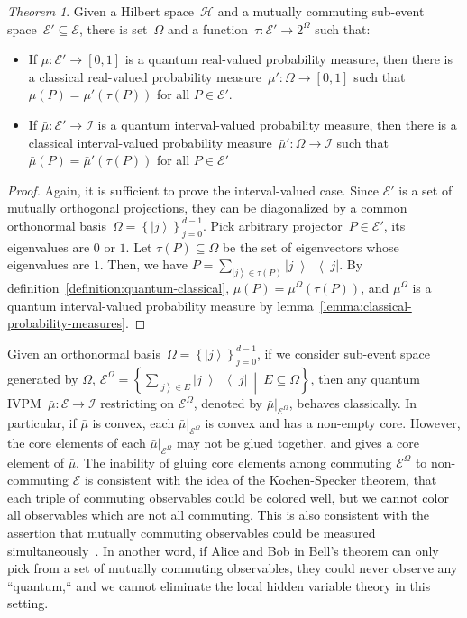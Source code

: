 \documentclass[12pt]{iopart}
\theoremstyle{remark}
\newtheorem{thm}{Theorem}
\newcommand{\Hilb}{\mathcal{H}}
\newcommand{\events}{\ensuremath{\mathcal{E}}}
\newcommand{\ket}[1]{{\left\vert{#1}\right\rangle}}
\newcommand{\op}[2]{\ensuremath{\left\vert{#1}\middle\rangle\middle\langle{#2}\right\vert}}
\newcommand{\proj}[1]{\op{#1}{#1}}
\newcommand{\set}[2]{\ensuremath{\left\{ {#1}~\middle|~{#2}\right\} }}
\begin{document}
\begin{thm}Given a Hilbert space~$\Hilb$ and a mutually commuting
sub-event space~$\events'\subseteq\events$, there is set~$\Omega$
and a function~$\tau:\events'\rightarrow2^{\Omega}$ such that:
\begin{itemize}
\item If $\mu:\events'\rightarrow\left[0,1\right]$ is a quantum real-valued
probability measure, then there is a classical real-valued probability
measure~$\mu':\Omega\rightarrow\left[0,1\right]$ such that $\mu\left(P\right)=\mu'\left(\tau\left(P\right)\right)$
for all $P\in\events'$.
\item If $\bar{\mu}:\events'\rightarrow\mathscr{I}$ is a quantum interval-valued
probability measure, then there is a classical interval-valued probability
measure~$\bar{\mu}':\Omega\rightarrow\mathscr{I}$ such that $\bar{\mu}\left(P\right)=\bar{\mu}'\left(\tau\left(P\right)\right)$
for all $P\in\events'$
\end{itemize}
\end{thm}

\begin{proof}Again, it is sufficient to prove the interval-valued
case. Since $\events'$ is a set of mutually orthogonal projections,
they can be diagonalized by a common orthonormal basis~$\Omega=\left\{ \ket{j}\right\} _{j=0}^{d-1}$.
Pick arbitrary projector~$P\in\events'$, its eigenvalues are $0$
or $1$. Let $\tau\left(P\right)\subseteq\Omega$ be the set of eigenvectors
whose eigenvalues are $1$. Then, we have $P=\sum_{\ket{j}\in\tau\left(P\right)}\proj{j}$.
By definition~\ref{definition:quantum-classical}, $\bar{\mu}\left(P\right)=\bar{\mu}^{\Omega}\left(\tau\left(P\right)\right)$,
and $\bar{\mu}^{\Omega}$ is a quantum interval-valued probability
measure by lemma~\ref{lemma:classical-probability-measures}.\end{proof}

Given an orthonormal basis~$\Omega=\left\{ \ket{j}\right\} _{j=0}^{d-1}$,
if we consider sub-event space generated by $\Omega$, $\events^{\Omega}=\set{\sum_{\ket{j}\in E}\proj{j}}{E\subseteq\Omega}$,
then any quantum IVPM~$\bar{\mu}:\events\rightarrow\mathscr{I}$
restricting on $\events^{\Omega}$, denoted by $\bar{\mu}|_{\events^{\Omega}}$,
behaves classically. In particular, if $\bar{\mu}$ is convex, each
$\bar{\mu}|_{\events^{\Omega}}$ is convex and has a non-empty core.
However, the core elements of each $\bar{\mu}|_{\events^{\Omega}}$
may not be glued together, and gives a core element of $\bar{\mu}$.
The inability of gluing core elements among commuting $\events^{\Omega}$
to non-commuting $\events$ is consistent with the idea of the Kochen-Specker
theorem, that each triple of commuting observables could be colored
well, but we cannot color all observables which are not all commuting.
This is also consistent with the assertion that mutually commuting
observables could be measured simultaneously~\cite{Mermin_1993}.
In another word, if Alice and Bob in Bell's theorem can only pick
from a set of mutually commuting observables, they could never observe
any ``quantum,`` and we cannot eliminate the local hidden variable
theory in this setting.
\end{document}
